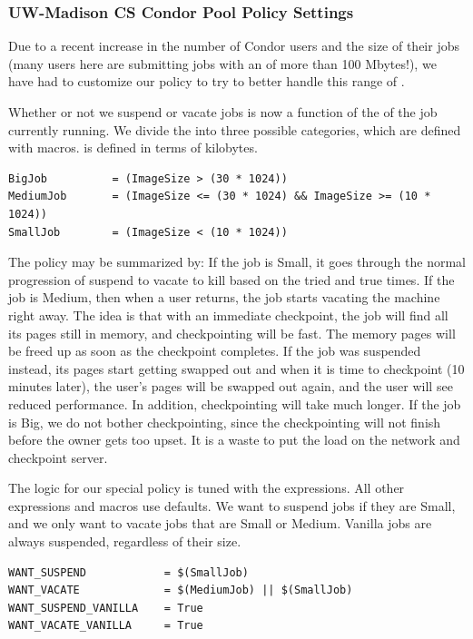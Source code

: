 \subsubsection{\label{sec:UW-Policy}
UW-Madison CS Condor Pool Policy Settings} 

Due to a recent increase in the number of Condor users and the size of
their jobs (many users here are submitting jobs with an
 of more than 100 Mbytes!), we have had to customize our
policy to try to better handle this range of .

Whether or not we suspend or vacate jobs is now a function
of the  of the job currently running.
We divide the 
into three possible categories, which are defined with macros.
 is defined in terms of kilobytes.
\begin{verbatim}
BigJob          = (ImageSize > (30 * 1024))
MediumJob       = (ImageSize <= (30 * 1024) && ImageSize >= (10 * 1024))
SmallJob        = (ImageSize < (10 * 1024))
\end{verbatim}

The policy may be summarized by: If the
job is Small, it goes through the normal progression of suspend to
vacate to kill based on the tried and true times.
If the job is Medium, then when a user returns,
the job starts vacating the machine right away.
The idea is that 
with an immediate checkpoint, the job will find all its pages
still in memory, and checkpointing will be fast.
The memory pages will be freed up as soon as the checkpoint completes.
If the job was suspended instead, its pages
start getting swapped out and when it is time to checkpoint (10
minutes later), the user's pages will be swapped out
again, and the user will see reduced performance.
In addition, checkpointing will take much longer.
If the job is Big, we do not bother checkpointing,
since the checkpointing will not finish before the owner
gets too upset.
It is a waste to
put the load on the network and checkpoint server.

The logic for our special policy is tuned with the
 expressions. 
All other expressions and macros use defaults.
We want to suspend jobs if they are Small, and we only want
to vacate jobs that are Small or Medium.  
Vanilla jobs are always suspended, regardless of their size.
\begin{verbatim}
WANT_SUSPEND            = $(SmallJob)
WANT_VACATE             = $(MediumJob) || $(SmallJob)
WANT_SUSPEND_VANILLA    = True
WANT_VACATE_VANILLA     = True
\end{verbatim}

